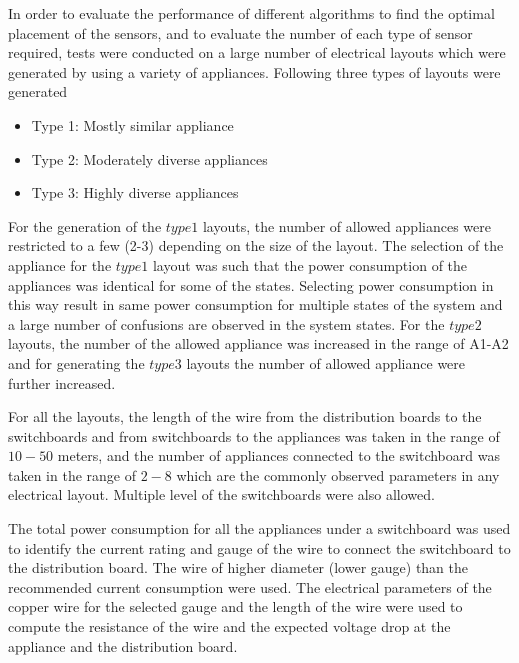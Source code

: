 In order to evaluate the performance of different algorithms to find the optimal placement of the sensors, and to evaluate the number of each type of sensor required, tests were conducted on a large number of electrical layouts which were generated by using a variety of appliances. Following three types of layouts were generated

\begin{itemize}
    \item Type 1: Mostly similar appliance
    \item Type 2: Moderately diverse appliances
    \item Type 3: Highly diverse appliances
\end{itemize}

For the generation of the $type 1$ layouts, the number of allowed appliances were restricted to a few (2-3) depending on the size of the layout. The selection of the appliance for the $type 1$ layout was such that the power consumption of the appliances was identical for some of the states. Selecting power consumption in this way result in same power consumption for multiple states of the system and a large number of confusions are observed in the system states. For the $type 2$ layouts, the number of the allowed appliance was increased in the range of A1-A2 and for generating the $type 3$  layouts the number of allowed appliance were further increased.

For all the layouts, the length of the wire from the distribution boards to the switchboards and from switchboards to the appliances was taken in the range of $10-50$ meters, and the number of appliances connected to the switchboard was taken in the range of $2-8$ which are the commonly observed parameters in any electrical layout.  Multiple level of the switchboards were also allowed.

The total power consumption for all the appliances under a switchboard was used to identify the current rating and gauge of the wire to connect the switchboard to the distribution board. The wire of  higher diameter (lower gauge) than the recommended current consumption were used.   The electrical parameters of the copper wire for the selected gauge and the length of the wire were used to compute the resistance of the wire and the expected voltage drop at the appliance and the distribution board.

